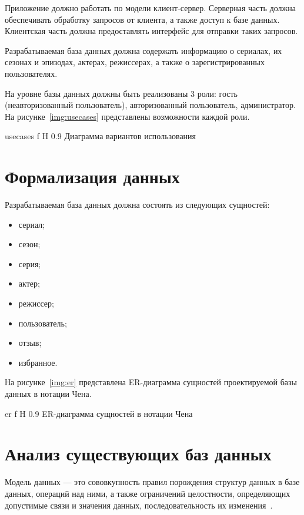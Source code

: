 Приложение должно работать по модели клиент-сервер. 
Серверная часть должна обеспечивать обработку запросов от клиента, а также доступ к базе данных.
Клиентская часть должна предоставлять интерфейс для отправки таких запросов.

Разрабатываемая база данных должна содержать информацию о сериалах, их сезонах и эпизодах, актерах, режиссерах, а также о зарегистрированных пользователях.

На уровне базы данных должны быть реализованы 3 роли: гость (неавторизованный пользователь), авторизованный пользователь, администратор.
На рисунке~\ref{img:usecases} представлены возможности каждой роли.

    {usecases} %
    {f} %
    {H} %
    {0.9\textwidth} %
    {Диаграмма вариантов использования} %

\section{Формализация данных}

Разрабатываемая база данных должна состоять из следующих сущностей:
\begin{itemize}[label=---]
    \item сериал;
    \item сезон;
    \item серия;
    \item актер;
    \item режиссер;
    \item пользователь;
    \item отзыв;
    \item избранное.
\end{itemize}

На рисунке~\ref{img:er} представлена ER-диаграмма сущностей проектируемой базы данных в нотации Чена.

    {er}
    {f}
    {H}
    {0.9\textwidth}
    {ER-диаграмма сущностей в нотации Чена}

\section{Анализ существующих баз данных}

Модель данных --- это сововкупность правил порождения структур данных в базе данных, операций над ними, а также ограничений целостности, определяющих допустимые связи и значения данных, последовательность их изменения~\cite{model-def}.

